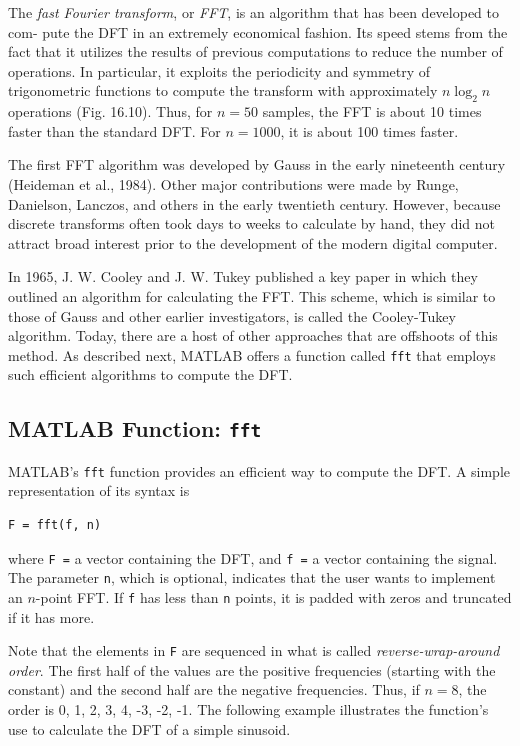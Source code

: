 \documentclass[../main.tex]{subfiles}
\begin{document}
The \textit{fast Fourier transform}, or \textit{FFT}, is an algorithm that has been developed to com-
pute the DFT in an extremely economical fashion. Its speed stems from the fact that it
utilizes the results of previous computations to reduce the number of operations. In particular, it exploits the periodicity and symmetry of trigonometric functions to compute
the transform with approximately $n \log_2n$ operations (Fig. 16.10). Thus, for $n = 50$ samples, the FFT is about 10 times faster than the standard DFT. For $n = 1000$, it is about
100 times faster.

The first FFT algorithm was developed by Gauss in the early nineteenth century
(Heideman et al., 1984). Other major contributions were made by Runge, Danielson,
Lanczos, and others in the early twentieth century. However, because discrete transforms
often took days to weeks to calculate by hand, they did not attract broad interest prior to the
development of the modern digital computer.

In 1965, J. W. Cooley and J. W. Tukey published a key paper in which they outlined an
algorithm for calculating the FFT. This scheme, which is similar to those of Gauss and
other earlier investigators, is called the Cooley-Tukey algorithm. Today, there are a host of
other approaches that are offshoots of this method. As described next, MATLAB offers a
function called \texttt{fft} that employs such efficient algorithms to compute the DFT.

\label{cha:cha_P_16_5_2} %
\subsection{MATLAB Function: \texttt{fft}}

\noindent MATLAB's \texttt{fft} function provides an efficient way to compute the DFT. A simple representation of its syntax is

\begin{lstlisting}[numbers=none]
	F = fft(f, n)
\end{lstlisting}

where \texttt{F =} a vector containing the DFT, and \texttt{f =} a vector containing the signal. The
parameter \texttt{n}, which is optional, indicates that the user wants to implement an $n$-point FFT.
If \texttt{f} has less than \texttt{n} points, it is padded with zeros and truncated if it has more.

Note that the elements in \texttt{F} are sequenced in what is called \textit{reverse-wrap-around
order}. The first half of the values are the positive frequencies (starting with the constant)
and the second half are the negative frequencies. Thus, if $n = 8$, the order is 0, 1, 2, 3, 4, -3, -2, -1. The following example illustrates the function's use to calculate the DFT of a
simple sinusoid.
\end{document}
